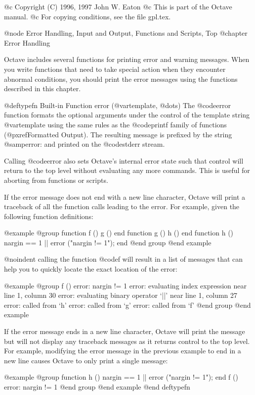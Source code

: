@c Copyright (C) 1996, 1997 John W. Eaton
@c This is part of the Octave manual.
@c For copying conditions, see the file gpl.tex.

@node Error Handling, Input and Output, Functions and Scripts, Top
@chapter Error Handling

Octave includes several functions for printing error and warning
messages.  When you write functions that need to take special action
when they encounter abnormal conditions, you should print the error
messages using the functions described in this chapter.

@deftypefn {Built-in Function} {} error (@var{template}, @dots{})
The @code{error} function formats the optional arguments under the
control of the template string @var{template} using the same rules as
the @code{printf} family of functions (@pxref{Formatted Output}).
The resulting message is prefixed by the string @samp{error: } and
printed on the @code{stderr} stream.

Calling @code{error} also sets Octave's internal error state such that
control will return to the top level without evaluating any more
commands.  This is useful for aborting from functions or scripts.

If the error message does not end with a new line character, Octave will
print a traceback of all the function calls leading to the error.  For
example, given the following function definitions:

@example
@group
function f () g () end
function g () h () end
function h () nargin == 1 || error ("nargin != 1"); end
@end group
@end example

@noindent
calling the function @code{f} will result in a list of messages that
can help you to quickly locate the exact location of the error:

@example
@group
f ()
error: nargin != 1
error: evaluating index expression near line 1, column 30
error: evaluating binary operator `||' near line 1, column 27
error: called from `h'
error: called from `g'
error: called from `f'
@end group
@end example

If the error message ends in a new line character, Octave will print the
message but will not display any traceback messages as it returns
control to the top level.  For example, modifying the error message
in the previous example to end in a new line causes Octave to only print
a single message:

@example
@group
function h () nargin == 1 || error ("nargin != 1\n"); end
f ()
error: nargin != 1
@end group
@end example
@end deftypefn

